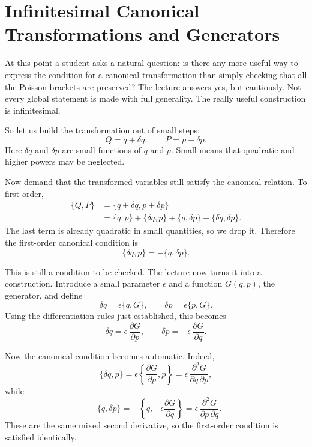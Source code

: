 \section{Infinitesimal Canonical Transformations and Generators}

At this point a student asks a natural question: is there any more useful way to express the condition for a canonical transformation than simply checking that all the Poisson brackets are preserved? The lecture answers yes, but cautiously. Not every global statement is made with full generality. The really useful construction is infinitesimal.

So let us build the transformation out of small steps:
\begin{equation}
Q=q+\delta q,\qquad P=p+\delta p.
\end{equation}
Here \(\delta q\) and \(\delta p\) are small functions of \(q\) and \(p\). Small means that quadratic and higher powers may be neglected.

Now demand that the transformed variables still satisfy the canonical relation. To first order,
\begin{align}
\{Q,P\}
&=\{q+\delta q,p+\delta p\} \\
&=\{q,p\}+\{\delta q,p\}+\{q,\delta p\}+\{\delta q,\delta p\}.
\end{align}
The last term is already quadratic in small quantities, so we drop it. Therefore the first-order canonical condition is
\begin{equation}
\{\delta q,p\}=-\{q,\delta p\}.
\end{equation}

This is still a condition to be checked. The lecture now turns it into a construction. Introduce a small parameter \(\epsilon\) and a function \(G(q,p)\), the generator, and define
\begin{equation}
\delta q=\epsilon\{q,G\},\qquad \delta p=\epsilon\{p,G\}.
\end{equation}
Using the differentiation rules just established, this becomes
\begin{equation}
\delta q=\epsilon\,\frac{\partial G}{\partial p},
\qquad
\delta p=-\epsilon\,\frac{\partial G}{\partial q}.
\end{equation}

Now the canonical condition becomes automatic. Indeed,
\[
\{\delta q,p\}
=\epsilon\left\{\frac{\partial G}{\partial p},p\right\}
=\epsilon\,\frac{\partial^2 G}{\partial q\,\partial p},
\]
while
\[
-\{q,\delta p\}
=-\left\{q,-\epsilon\frac{\partial G}{\partial q}\right\}
=\epsilon\,\frac{\partial^2 G}{\partial p\,\partial q}.
\]
These are the same mixed second derivative, so the first-order condition is satisfied identically.

